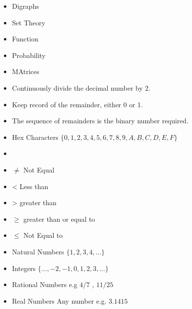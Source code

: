 \documentclass[]{report}
\begin{document}
\begin{itemize}
\item Digraphs
\item Set Theory
\item Function
\item Probability
\item MAtrices
\end{itemize}



\begin{itemize}
\item Continuously divide the decimal number by 2.
\item Keep record of the remainder, either 0 or 1.
\item The sequence of remainders is the binary number required.
\end{itemize}


\begin{itemize}
\item Hex Characters $\{0,1,2,3,4,5,6,7,8,9,A,B,C,D,E,F\}$
\item 
\end{itemize}


\begin{itemize}
\item $\neq$ Not Equal
\item < Less than
\item > greater than
\item $\geq$ greater than or equal to
\item $\leq$ Not Equal to
\end{itemize}


\begin{itemize}
\item Natural Numbers $\{1,2,3,4, \ldots\}$
\item Integers $\{\ldots,-2,-1,0,1,2,3,\ldots\}$
\item Rational Numbers e.g $4/7$ , $11/25$
\item Real Numbers Any number e.g. $3.1415$
\end{itemize}
\end{document}
